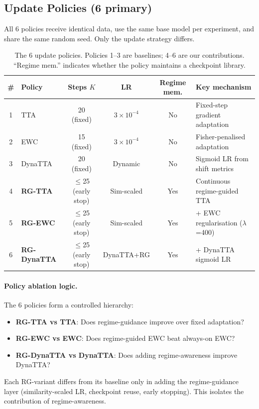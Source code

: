 \documentclass[11pt,a4paper]{article}
\begin{document}
\subsection{Update Policies (6 primary)}
\label{sec:policies}

All 6 policies receive identical data, use the same base model per experiment, and share the same random seed. Only the update strategy differs.

\begin{table}[t]
\centering
\caption{The 6 update policies. Policies 1--3 are baselines; 4--6 are our contributions. ``Regime mem.'' indicates whether the policy maintains a checkpoint library.}
\label{tab:policies}
\small
\begin{tabular}{clcccl}
\toprule
\# & Policy & Steps $K$ & LR & Regime mem. & Key mechanism \\
\midrule
1 & TTA & 20 (fixed) & $3{\times}10^{-4}$ & No & Fixed-step gradient adaptation \\
2 & EWC & 15 (fixed) & $3{\times}10^{-4}$ & No & Fisher-penalised adaptation \\
3 & DynaTTA & 20 (fixed) & Dynamic & No & Sigmoid LR from shift metrics \\
\midrule
4 & \textbf{RG-TTA} & $\leq$25 (early stop) & Sim-scaled & Yes & Continuous regime-guided TTA \\
5 & \textbf{RG-EWC} & $\leq$25 (early stop) & Sim-scaled & Yes & + EWC regularisation ($\lambda$=400) \\
6 & \textbf{RG-DynaTTA} & $\leq$25 (early stop) & DynaTTA+RG & Yes & + DynaTTA sigmoid LR \\
\bottomrule
\end{tabular}
\end{table}

\paragraph{Policy ablation logic.} The 6 policies form a controlled hierarchy:
\begin{itemize}[nosep]
  \item \textbf{RG-TTA vs TTA}: Does regime-guidance improve over fixed adaptation?
  \item \textbf{RG-EWC vs EWC}: Does regime-guided EWC beat always-on EWC?
  \item \textbf{RG-DynaTTA vs DynaTTA}: Does adding regime-awareness improve DynaTTA?
\end{itemize}

Each RG-variant differs from its baseline only in adding the regime-guidance layer (similarity-scaled LR, checkpoint reuse, early stopping). This isolates the contribution of regime-awareness.
\end{document}
